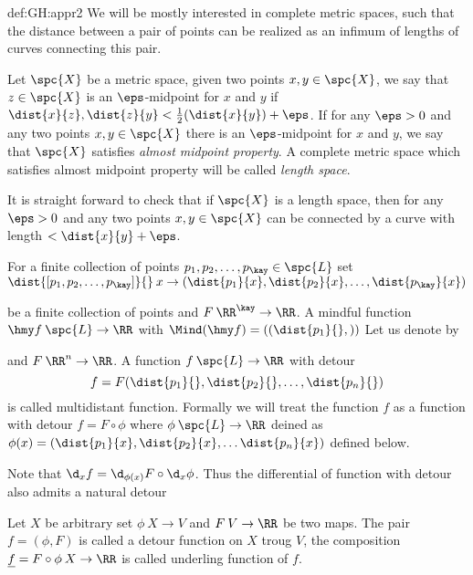 {\begin{subthm}{def:GH:appr2}
We will be mostly interested in complete metric spaces, such that the distance between a pair of points can be realized as an infimum of lengths of curves connecting this pair.

Let $\spc{X}$ be a metric space, given two points $x,y\in \spc{X}$, we say that $z\in \spc{X}$ is an $\eps$-midpoint for $x$ and $y$ if $\dist{x}{z},\dist{z}{y}<\tfrac12(\dist{x}{y})+\eps$.
If for any $\eps>0$ and any two points $x,y\in \spc{X}$ there is an $\eps$-midpoint for $x$ and $y$,
we say that $\spc{X}$ satisfies \emph{almost midpoint property}.
A complete metric space which satisfies almost midpoint property will be called \emph{length space}.

It is straight forward to check that if $\spc{X}$ is a length space, then for any $\eps>0$ and any two points $x,y\in \spc{X}$ can be connected by a curve with length $<\dist{x}{y}+\eps$.









For a finite collection of points 
$p_1,p_2,\dots,p_\kay\in\spc{L}$ 
set
$\dist{[p_1,p_2,\dots,p_\kay]}{}\:x\to(\dist{p_1}{x},\dist{p_2}{x},\dots,\dist{p_\kay}{x})$ 


be a finite collection of points and $F\:\RR^\kay\to\RR$.
A mindful function
$\hmy f\:\spc{L}\to\RR$ with $\Mind(\hmy f)=((\dist{p_1}{},))$
Let us denote by 

and $F\:\RR^n\to\RR$.
A function $f\:\spc{L}\to\RR$ with detour
$$f=F(\dist{p_1}{},\dist{p_2}{},\dots,\dist{p_n}{})$$ is called multidistant function.
Formally we will treat the function $f$ as a function with detour $f=F\circ\phi$ where $\phi\:\spc{L}\to\RR$ deined as $\phi(x)=(\dist{p_1}{x},\dist{p_2}{x},\dots\dist{p_n}{x})$ defined below.

Note that $\d_xf=\d_{\phi(x)}F\circ\d_x\phi$.
Thus the differential of function with detour also admits a natural detour 
















Let $X$ be arbitrary set
$\phi\:X\to V$ and $F\:V\to\RR$ be two maps.
The pair $f=(\phi,F)$ is called a detour function on $X$ troug $V$,
the composition $\underline f=F\circ\phi\:X\to\RR$ is called underling function of $f$.


\end{subthm}}
